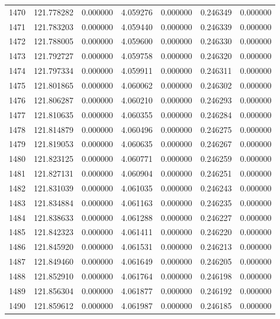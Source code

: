 \begin{tabular}{rrrrrrr}
1470 & 121.778282 &    0.000000 &  4.059276 &   0.000000 &   0.246349 &  0.000000 \\
1471 & 121.783203 &    0.000000 &  4.059440 &   0.000000 &   0.246339 &  0.000000 \\
1472 & 121.788005 &    0.000000 &  4.059600 &   0.000000 &   0.246330 &  0.000000 \\
1473 & 121.792727 &    0.000000 &  4.059758 &   0.000000 &   0.246320 &  0.000000 \\
1474 & 121.797334 &    0.000000 &  4.059911 &   0.000000 &   0.246311 &  0.000000 \\
1475 & 121.801865 &    0.000000 &  4.060062 &   0.000000 &   0.246302 &  0.000000 \\
1476 & 121.806287 &    0.000000 &  4.060210 &   0.000000 &   0.246293 &  0.000000 \\
1477 & 121.810635 &    0.000000 &  4.060355 &   0.000000 &   0.246284 &  0.000000 \\
1478 & 121.814879 &    0.000000 &  4.060496 &   0.000000 &   0.246275 &  0.000000 \\
1479 & 121.819053 &    0.000000 &  4.060635 &   0.000000 &   0.246267 &  0.000000 \\
1480 & 121.823125 &    0.000000 &  4.060771 &   0.000000 &   0.246259 &  0.000000 \\
1481 & 121.827131 &    0.000000 &  4.060904 &   0.000000 &   0.246251 &  0.000000 \\
1482 & 121.831039 &    0.000000 &  4.061035 &   0.000000 &   0.246243 &  0.000000 \\
1483 & 121.834884 &    0.000000 &  4.061163 &   0.000000 &   0.246235 &  0.000000 \\
1484 & 121.838633 &    0.000000 &  4.061288 &   0.000000 &   0.246227 &  0.000000 \\
1485 & 121.842323 &    0.000000 &  4.061411 &   0.000000 &   0.246220 &  0.000000 \\
1486 & 121.845920 &    0.000000 &  4.061531 &   0.000000 &   0.246213 &  0.000000 \\
1487 & 121.849460 &    0.000000 &  4.061649 &   0.000000 &   0.246205 &  0.000000 \\
1488 & 121.852910 &    0.000000 &  4.061764 &   0.000000 &   0.246198 &  0.000000 \\
1489 & 121.856304 &    0.000000 &  4.061877 &   0.000000 &   0.246192 &  0.000000 \\
1490 & 121.859612 &    0.000000 &  4.061987 &   0.000000 &   0.246185 &  0.000000 \\

\end{tabular}
